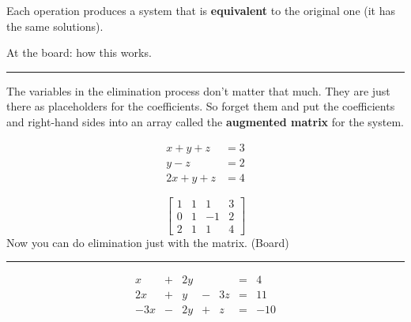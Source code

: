 \documentclass[
  letterpaper,
  DIV=11,
  numbers=noendperiod]{scrartcl}
\begin{document}
Each operation produces a system that is \textbf{equivalent} to the
original one (it has the same solutions).

At the board: how this works.

\begin{center}\rule{0.5\linewidth}{0.5pt}\end{center}

\begin{tcolorbox}[enhanced jigsaw, colbacktitle=quarto-callout-important-color!10!white, left=2mm, bottomrule=.15mm, toprule=.15mm, coltitle=black, opacityback=0, colframe=quarto-callout-important-color-frame, colback=white, arc=.35mm, toptitle=1mm, titlerule=0mm, rightrule=.15mm, leftrule=.75mm, breakable, bottomtitle=1mm, title=\textcolor{quarto-callout-important-color}{\faExclamation}\hspace{0.5em}{KEY INSIGHT}, opacitybacktitle=0.6]

The variables in the elimination process don't matter that much. They
are just there as placeholders for the coefficients. So forget them and
put the coefficients and right-hand sides into an array called the
\textbf{augmented matrix} for the system.

\end{tcolorbox}

\[\begin{align*}
x + y + z &= 3 \\   
y - z &= 2 \\ 
2x + y + z &= 4 
\end{align*}\]

\[\begin{bmatrix}
1 & 1 & 1 & 3 \\ 
0 & 1 & -1 & 2 \\ 
2 & 1 & 1 & 4
\end{bmatrix}\] Now you can do elimination just with the matrix. (Board)

\begin{center}\rule{0.5\linewidth}{0.5pt}\end{center}

\[\begin{equation*}
\begin{alignedat}{4}
x &  {}+{}  & 2y &  &  &  {}={}  & 4 \\
2x &  {}+{}  & y &  {}-{}  & 3z &  {}={}  & 11 \\
-3x &  {}-{}  & 2y &  {}+{}  & z &  {}={}  & -10 \\
\end{alignedat}
\end{equation*}\]
\end{document}
